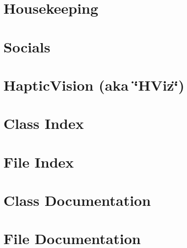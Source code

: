 \documentclass[twoside]{book}
\newcommand{\+}{\discretionary{\mbox{\scriptsize$\hookleftarrow$}}{}{}}
\newcommand{\clearemptydoublepage}{%
  \newpage{\pagestyle{empty}\cleardoublepage}%
}
\begin{document}
\chapter{Housekeeping}
\label{md__home_joseph_hviz_joel_ss_extras_Housekeeping_README}

\chapter{Socials}
\label{md__home_joseph_hviz_joel_ss_extras_Socials_README}

\chapter{Haptic\+Vision (aka \char`\"{}\+H\+Viz\char`\"{})}
\label{md__home_joseph_hviz_joel_ss_README}

\chapter{Class Index}

\chapter{File Index}

\chapter{Class Documentation}




\chapter{File Documentation}










\backmatter
\newpage
{}
\clearemptydoublepage
{}
\printindex
\end{document}
